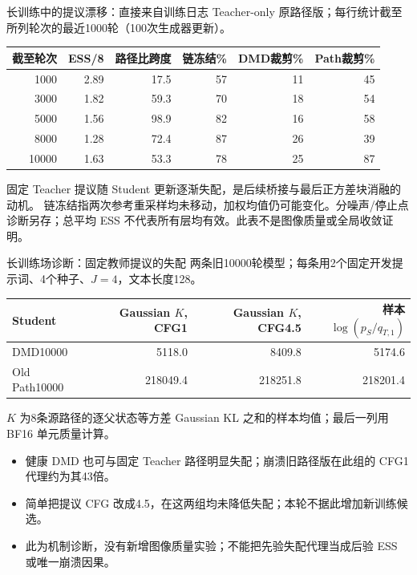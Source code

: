 \documentclass[10pt,aspectratio=169]{beamer}
\begin{document}
\begin{frame}{长训练中的提议漂移：直接来自训练日志}
\scriptsize\centering
Teacher-only 原路径版；每行统计截至所列轮次的最近1000轮（100次生成器更新）。
\begin{tabular}{rrrrrr}\toprule
截至轮次 & ESS/8 & 路径比跨度 & 链冻结\% & DMD裁剪\% & Path裁剪\%\\\midrule
1000 & 2.89 & 17.5 & 57 & 11 & 45 \\
3000 & 1.82 & 59.3 & 70 & 18 & 54 \\
5000 & 1.56 & 98.9 & 82 & 16 & 58 \\
8000 & 1.28 & 72.4 & 87 & 26 & 39 \\
10000 & 1.63 & 53.3 & 78 & 25 & 87 \\
\bottomrule\end{tabular}\par\raggedright\vspace{6pt}
固定 Teacher 提议随 Student 更新逐渐失配，是后续桥接与最后正方差块消融的动机。
链冻结指两次参考重采样均未移动，加权均值仍可能变化。分噪声/停止点诊断另存；总平均 ESS 不代表所有层均有效。此表不是图像质量或全局收敛证明。
\end{frame}
\begin{frame}{长训练场诊断：固定教师提议的失配}
\scriptsize\centering
两条旧10000轮模型；每条用2个固定开发提示词、4个种子、$J=4$，文本长度128。
\begin{tabular}{lrrr}\toprule
Student & Gaussian $K$, CFG1 & Gaussian $K$, CFG4.5 & 样本$\log(p_S/q_{T,1})$\\\midrule
DMD10000 & 5118.0 & 8409.8 & 5174.6 \\
Old Path10000 & 218049.4 & 218251.8 & 218201.4 \\
\bottomrule\end{tabular}\par\raggedright\vspace{5pt}
$K$ 为8条源路径的逐父状态等方差 Gaussian KL 之和的样本均值；最后一列用 BF16 单元质量计算。
\begin{itemize}\itemsep4pt
\item 健康 DMD 也可与固定 Teacher 路径明显失配；崩溃旧路径版在此组的 CFG1 代理约为其43倍。
\item 简单把提议 CFG 改成4.5，在这两组均未降低失配；本轮不据此增加新训练候选。
\item 此为机制诊断，没有新增图像质量实验；不能把先验失配代理当成后验 ESS 或唯一崩溃因果。
\end{itemize}
\end{frame}
\end{document}
